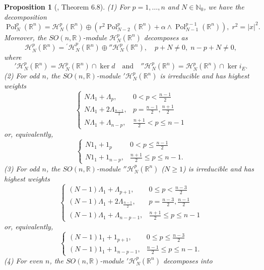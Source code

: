 \documentclass[a4paper,12pt,reqno]{amsart}
\newtheorem{prop}[theorem]{Proposition}
\numberwithin{theorem}{subsection}
\numberwithin{equation}{section}
\begin{document}
\begin{prop}[\cite{IT}, Theorem 6.8]\label{IT} (1) For $p=1,\dots,n$ and $N \in {\mathbb{N}}_0$, we have
the decomposition
$$
   {\operatorname{Pol}}^p_N({\mathbb{R}}^n) = {\mathcal H}^p_N({\mathbb{R}}^n) \oplus (r^2 {\operatorname{Pol}}_{N-2}^p({\mathbb{R}}^n) + \alpha \wedge
   {\operatorname{Pol}}_{N-1}^{p-1}({\mathbb{R}}^n)), \; r^2={\lvert{x}\rvert}^2.
$$
Moreover, the $SO(n,{\mathbb{R}})$-module ${\mathcal H}_N^p({\mathbb{R}}^n)$ decomposes as
$$
   {\mathcal H}_N^p({\mathbb{R}}^n) = {^\prime {\mathcal H}}_N^p({\mathbb{R}}^n) \oplus {''{\mathcal H}}_N^p({\mathbb{R}}^n),
   \quad p\!+\!N \ne 0, \; n\!-\!p\!+\!N \ne 0,
$$
where
$$
   {'{\mathcal H}}^p_N({\mathbb{R}}^n) = {\mathcal H}_N^p({\mathbb{R}}^n) \cap \ker d \quad \mbox{and}
   \quad {''{\mathcal H}}^p_N({\mathbb{R}}^n) = {\mathcal H}_N^p({\mathbb{R}}^n) \cap \ker i_E.
$$
(2) For odd $n$, the $SO(n,{\mathbb{R}})$-module ${'{\mathcal H}}^p_N({\mathbb{R}}^n)$ is irreducible and
has highest weights
$$
\begin{cases}
   N \Lambda_1 + \Lambda_p, & 0 < p < \frac{n-1}{2} \\
   N \Lambda_1 + 2 \Lambda_{\frac{n-1}{2}}, & p = \frac{n-1}{2},\frac{n+1}{2} \\
   N \Lambda_1 + \Lambda_{n-p}, & \frac{n+1}{2} < p \le n-1
\end{cases}
$$
or, equivalently,
$$
\begin{cases}
   N 1_1 + 1_p & 0 < p \le \frac{n-1}{2} \\
   N 1_1 + 1_{n-p}, & \frac{n+1}{2} \le p \le n-1.
\end{cases}
$$
(3) For odd $n$, the $SO(n,{\mathbb{R}})$-module ${''{\mathcal H}}^p_N({\mathbb{R}}^n)$ ($N \ge 1$) is
irreducible and has highest weights
$$
\begin{cases}
   (N\!-\!1) \Lambda_1 + \Lambda_{p+1}, & 0 \le p < \frac{n-3}{2} \\
   (N\!-\!1) \Lambda_1 + 2 \Lambda_{\frac{n-1}{2}}, & p = \frac{n-3}{2},\frac{n-1}{2} \\
   (N\!-\!1) \Lambda_1 + \Lambda_{n-p-1}, & \frac{n+1}{2} \le p \le n-1
\end{cases}
$$
or, equivalently,
$$
\begin{cases}
   (N\!-\!1) 1_1 + 1_{p+1}, & 0 \le p \le \frac{n-3}{2} \\
   (N\!-\!1) 1_1 + 1_{n-p-1}, & \frac{n-1}{2} \le p \le n-1.
\end{cases}
$$
(4) For even $n$, the $SO(n,{\mathbb{R}})$-module ${'{\mathcal H}}^p_N({\mathbb{R}}^n)$ decomposes into

\end{prop}
\end{document}

